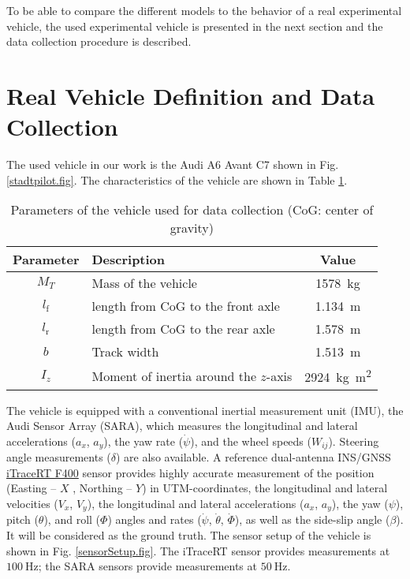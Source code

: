 \documentclass[journal]{IEEEtran}
\begin{document}
To be able to compare the different models to the behavior of a real experimental vehicle, the used experimental vehicle is presented in the next section and the data collection procedure is described.


\section{Real Vehicle Definition and Data Collection}\label{realData.sec}
The used vehicle in our work is the Audi A6 Avant C7 shown in Fig. \ref{stadtpilot.fig}. The characteristics of the vehicle are shown in Table \ref{vehicleChs.tab}.
\begin{table}
\vspace{.2cm}
\centering
    \caption{Parameters of the vehicle used for data collection (CoG: center of gravity)}
    \begin{tabular}{cp{}c}
      \toprule
      \textbf{Parameter} & \textbf{Description} & \textbf{Value} \\
      \midrule
      $M_T$ & Mass of the vehicle & \SI{1578}{\kilo\gram}\\
      $l_\mathrm{f}$ & length from CoG to the front axle & \SI{1.134}{\meter} \\
      $l_\mathrm{r}$ & length from CoG to the rear axle  & \SI{1.578}{\meter} \\
      $b$ & Track width & \SI{1.513}{\meter} \\
      $I_z$ & Moment of inertia around the $z$-axis & \SI{2924}{\kilo\gram\square\meter}\\
      \bottomrule
    \end{tabular}
\label{vehicleChs.tab}
\end{table}
The vehicle is equipped with a conventional inertial measurement unit (IMU), the Audi Sensor Array (SARA), which measures the longitudinal and lateral accelerations ($a_x$, $a_y$), the yaw rate ($\dot\psi$), and the wheel speeds ($W_{ij}$). Steering angle measurements ($\delta$) are also available. A reference dual-antenna INS/GNSS \href{https://www.imar-navigation.de/en/products/by-product-names/item/itracert-f200-itracert-f400-itracert-mvt}{iTraceRT F400} sensor provides highly accurate measurement of the position (Easting -- $X$ , Northing -- $Y$) in UTM-coordinates, the longitudinal and lateral velocities ($V_x$, $V_y$), the longitudinal and lateral accelerations ($a_x$, $a_y$), the yaw ($\psi$), pitch ($\theta$), and roll ($\Phi$) angles and rates ($\dot\psi$, $\dot\theta$, $\dot\Phi$), as well as the side-slip angle ($\beta$). It will be considered as the ground truth. The sensor setup of the vehicle is shown in Fig. \ref{sensorSetup.fig}. The iTraceRT sensor provides measurements at $\SI{100}{\hertz}$; the SARA sensors provide measurements at $\SI{50}{\hertz}$. 
\end{document}
